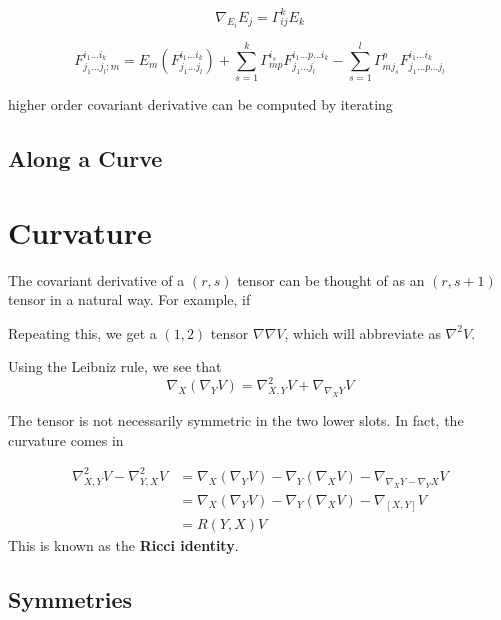 \begin{equation*}
    \nabla_{E_i}E_j=\Gamma^k_{ij}E_k
\end{equation*}


\begin{proposition}
    \begin{equation*}
        F^{i_1\dots i_k}_{j_1\dots j_l;m}=E_m(F^{i_1\dots i_k}_{j_1\dots j_l})+\sum_{s=1}^{k}\Gamma^{i_s}_{mp} F^{i_1 \dots p \dots i_k}_{j_1\dots j_l}-\sum_{s=1}^{l}\Gamma^{p}_{mj_s} F^{i_1 \dots i_k}_{j_1\dots p \dots j_l}
    \end{equation*}
\end{proposition}

higher order covariant derivative can be computed by iterating


\subsection{Along a Curve}

\section{Curvature}

The covariant derivative of a $(r,s)$ tensor can be thought of as an $(r,s+1)$ tensor in a natural way.
For example, if 

Repeating this, we get a $(1,2)$ tensor $\nabla\nabla V$, which will abbreviate as $\nabla^2 V$.

Using the Leibniz rule, we see that 
\begin{equation*}
    \nabla_X(\nabla_Y V)=\nabla^2_{X,Y}V+\nabla_{\nabla_X Y}V
\end{equation*}

The tensor is not necessarily symmetric in the two lower slots. In fact, the curvature comes in 

\begin{align*}
    \nabla^2_{X,Y}V-\nabla^2_{Y,X}V&= \nabla_X(\nabla_Y V)-\nabla_Y(\nabla_X V)-\nabla_{\nabla_X Y-\nabla_Y X}V\\
    &=\nabla_X(\nabla_Y V)-\nabla_Y(\nabla_X V)-\nabla_{[X,Y]}V\\
    &=R(Y,X)V
\end{align*}
This is known as the \textbf{Ricci identity}.

\begin{definition}
    
\end{definition}

\subsection{Symmetries}
